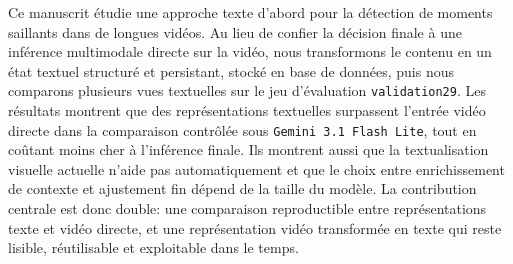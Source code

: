 Ce manuscrit \'etudie une approche texte d'abord pour la d\'etection de moments saillants dans de longues vid\'eos. Au lieu de confier la d\'ecision finale \`a une inf\'erence multimodale directe sur la vid\'eo, nous transformons le contenu en un \'etat textuel structur\'e et persistant, stock\'e en base de donn\'ees, puis nous comparons plusieurs vues textuelles sur le jeu d'\'evaluation \texttt{validation29}. Les r\'esultats montrent que des repr\'esentations textuelles surpassent l'entr\'ee vid\'eo directe dans la comparaison contr\^ol\'ee sous \texttt{Gemini 3.1 Flash Lite}, tout en co\^utant moins cher \`a l'inf\'erence finale. Ils montrent aussi que la textualisation visuelle actuelle n'aide pas automatiquement et que le choix entre enrichissement de contexte et ajustement fin d\'epend de la taille du mod\`ele. La contribution centrale est donc double: une comparaison reproductible entre repr\'esentations texte et vid\'eo directe, et une repr\'esentation vid\'eo transform\'ee en texte qui reste lisible, r\'eutilisable et exploitable dans le temps.
